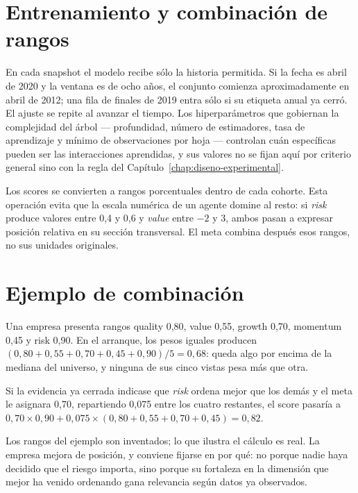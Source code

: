 \section{Entrenamiento y combinación de rangos}

En cada snapshot el modelo recibe sólo la historia permitida. Si la fecha es abril de 2020 y la
ventana es de ocho años, el conjunto comienza aproximadamente en abril de 2012; una fila de finales
de 2019 entra sólo si su etiqueta anual ya cerró. El ajuste se repite al avanzar el tiempo. Los
hiperparámetros que gobiernan la complejidad del árbol --- profundidad, número de estimadores, tasa
de aprendizaje y mínimo de observaciones por hoja --- controlan cuán específicas pueden ser las
interacciones aprendidas, y sus valores no se fijan aquí por criterio general sino con la regla del
Capítulo~\ref{chap:diseno-experimental}.

Los scores se convierten a rangos porcentuales dentro de cada cohorte. Esta operación evita que la
escala numérica de un agente domine al resto: si \textit{risk} produce valores entre 0,4 y 0,6 y
\textit{value} entre $-2$ y $3$, ambos pasan a expresar posición relativa en su sección transversal.
El meta combina después esos rangos, no sus unidades originales.

\section{Ejemplo de combinación}

\begin{ejemplo}
Una empresa presenta rangos quality 0,80, value 0,55, growth 0,70, momentum 0,45 y risk 0,90. En el
arranque, los pesos iguales producen $(0,80+0,55+0,70+0,45+0,90)/5=0,68$: queda algo por encima de
la mediana del universo, y ninguna de sus cinco vistas pesa más que otra.

Si la evidencia ya cerrada indicase que \textit{risk} ordena mejor que los demás y el meta le
asignara 0,70, repartiendo 0,075 entre los cuatro restantes, el score pasaría a
$0{,}70\times0{,}90 + 0{,}075\times(0{,}80+0{,}55+0{,}70+0{,}45) = 0{,}82$.
\end{ejemplo}

Los rangos del ejemplo son inventados; lo que ilustra el cálculo es real. La empresa mejora de
posición, y conviene fijarse en por qué: no porque nadie haya decidido que el riesgo importa, sino
porque su fortaleza en la dimensión que mejor ha venido ordenando gana relevancia según datos ya
observados.

